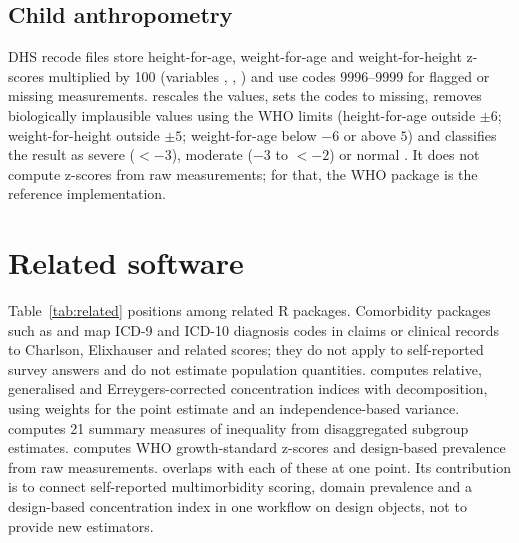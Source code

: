 \subsection{Child anthropometry}

DHS recode files store height-for-age, weight-for-age and weight-for-height z-scores multiplied by 100 (variables , , ) and use codes 9996--9999 for flagged or missing measurements.  rescales the values, sets the codes to missing, removes biologically implausible values using the WHO limits (height-for-age outside $\pm 6$; weight-for-height outside $\pm 5$; weight-for-age below $-6$ or above $5$) and classifies the result as severe ($< -3$), moderate ($-3$ to $< -2$) or normal \citep{who2006}. It does not compute z-scores from raw measurements; for that, the WHO  package is the reference implementation.

\section{Related software}

Table~\ref{tab:related} positions  among related R packages. Comorbidity packages such as  \citep{gasparini2018} and  \citep{bensken2023} map ICD-9 and ICD-10 diagnosis codes in claims or clinical records to Charlson, Elixhauser and related scores; they do not apply to self-reported survey answers and do not estimate population quantities.  \citep{rineq} computes relative, generalised and Erreygers-corrected \citep{erreygers2009} concentration indices with decomposition, using weights for the point estimate and an independence-based variance.  \citep{healthequal} computes 21 summary measures of inequality from disaggregated subgroup estimates.  \citep{anthro} computes WHO growth-standard z-scores and design-based prevalence from raw measurements.  overlaps with each of these at one point. Its contribution is to connect self-reported multimorbidity scoring, domain prevalence and a design-based concentration index in one workflow on  design objects, not to provide new estimators.


